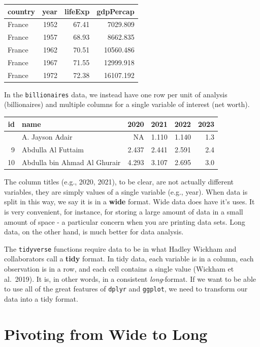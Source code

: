 \documentclass[
  letterpaper,
]{book}
\begin{document}
\begin{longtable}[]{@{}lrrr@{}}
\toprule\noalign{}
country & year & lifeExp & gdpPercap \\
\midrule\noalign{}
\endhead
\bottomrule\noalign{}
\endlastfoot
France & 1952 & 67.41 & 7029.809 \\
France & 1957 & 68.93 & 8662.835 \\
France & 1962 & 70.51 & 10560.486 \\
France & 1967 & 71.55 & 12999.918 \\
France & 1972 & 72.38 & 16107.192 \\
\end{longtable}

In the \texttt{billionaires} data, we instead have one row per unit of
analysis (billionaires) and multiple columns for a single variable of
interest (net worth).

\begin{longtable}[]{@{}rlrrrr@{}}
\toprule\noalign{}
id & name & 2020 & 2021 & 2022 & 2023 \\
\midrule\noalign{}
\endhead
\bottomrule\noalign{}
\endlastfoot
1 & A. Jayson Adair & NA & 1.110 & 1.140 & 1.3 \\
9 & Abdulla Al Futtaim & 2.437 & 2.441 & 2.591 & 2.4 \\
10 & Abdulla bin Ahmad Al Ghurair & 4.293 & 3.107 & 2.695 & 3.0 \\
\end{longtable}

The column titles (e.g., 2020, 2021), to be clear, are not actually
different variables, they are simply values of a single variable (e.g.,
year). When data is split in this way, we say it is in a \textbf{wide}
format. Wide data does have it's uses. It is very convenient, for
instance, for storing a large amount of data in a small amount of space
- a particular concern when you are printing data sets. Long data, on
the other hand, is much better for data analysis.

The \texttt{tidyverse} functions require data to be in what Hadley
Wickham and collaborators call a \textbf{tidy} format. In tidy data,
each variable is in a column, each observation is in a row, and each
cell contains a single value (Wickham et al.~2019). It is, in other
words, in a consistent \emph{long}-format. If we want to be able to use
all of the great features of \texttt{dplyr} and \texttt{ggplot}, we need
to transform our data into a tidy format.

\hypertarget{pivoting-from-wide-to-long}{%
\section{Pivoting from Wide to Long}\label{pivoting-from-wide-to-long}}
\end{document}
